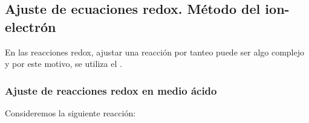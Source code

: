 \subsection{Ajuste de ecuaciones redox. Método del ion-electrón}\label{subsec:ajuste-de-ecuaciones-redox.-metodo-del-ion-electron}

En las reacciones redox, ajustar una reacción por tanteo puede ser algo complejo y por este motivo, se utiliza el .

\subsubsection{Ajuste de reacciones redox en medio ácido}

Consideremos la siguiente reacción:

\begin{centeredequation}
\end{centeredequation}


